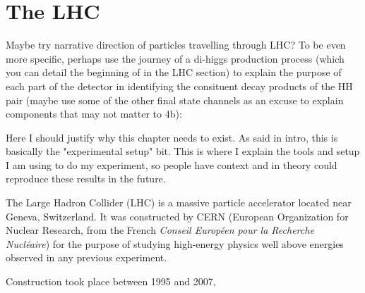 \chapter{The LHC}\label{chapter:lhc}

Maybe try narrative direction of particles travelling through LHC?
To be even more specific, perhaps use the journey of a di-higgs production process
(which you can detail the beginning of in the LHC section)
to explain the purpose of each part of the detector in identifying the consituent decay products of the HH pair
(maybe use some of the other final state channels as an excuse to explain components that may not matter to 4b):




Here I should justify why this chapter needs to exist. As said in intro, this is basically the "experimental setup" bit. This is where I explain the tools and setup I am using to do my experiment, so people have context and in theory could reproduce these results in the future.






The Large Hadron Collider (LHC) is a massive particle accelerator located near Geneva, Switzerland.
It was constructed by CERN (European Organization for Nuclear Research, from the French \textit{Conseil Européen pour la Recherche Nucléaire}) for the purpose of studying high-energy physics well above energies observed in any previous experiment.

Construction took place between 1995 and 2007, 





